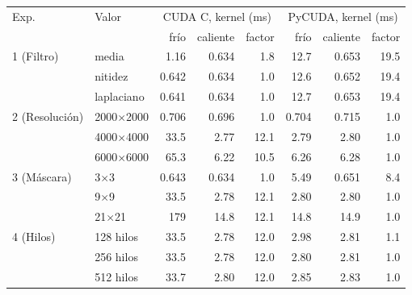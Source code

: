 \begin{tabular}{llrrrrrr}
\toprule
Exp. & Valor & \multicolumn{3}{c}{CUDA C, kernel (ms)} & \multicolumn{3}{c}{PyCUDA, kernel (ms)} \\
 & & frío & caliente & factor & frío & caliente & factor \\
\midrule
1 (Filtro) & media & 1.16 & 0.634 & 1.8 & 12.7 & 0.653 & 19.5 \\
 & nitidez & 0.642 & 0.634 & 1.0 & 12.6 & 0.652 & 19.4 \\
 & laplaciano & 0.641 & 0.634 & 1.0 & 12.7 & 0.653 & 19.4 \\
\midrule
2 (Resolución) & 2000$\times$2000 & 0.706 & 0.696 & 1.0 & 0.704 & 0.715 & 1.0 \\
 & 4000$\times$4000 & 33.5 & 2.77 & 12.1 & 2.79 & 2.80 & 1.0 \\
 & 6000$\times$6000 & 65.3 & 6.22 & 10.5 & 6.26 & 6.28 & 1.0 \\
\midrule
3 (Máscara) & 3$\times$3 & 0.643 & 0.634 & 1.0 & 5.49 & 0.651 & 8.4 \\
 & 9$\times$9 & 33.5 & 2.78 & 12.1 & 2.80 & 2.80 & 1.0 \\
 & 21$\times$21 & 179 & 14.8 & 12.1 & 14.8 & 14.9 & 1.0 \\
\midrule
4 (Hilos) & 128 hilos & 33.5 & 2.78 & 12.0 & 2.98 & 2.81 & 1.1 \\
 & 256 hilos & 33.5 & 2.78 & 12.0 & 2.80 & 2.81 & 1.0 \\
 & 512 hilos & 33.7 & 2.80 & 12.0 & 2.85 & 2.83 & 1.0 \\
\bottomrule
\end{tabular}
